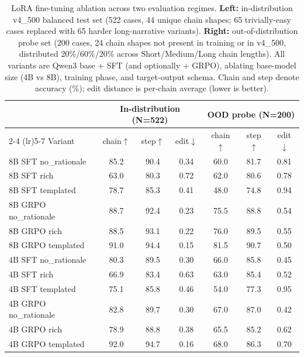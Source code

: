 \begin{table}[!ht]
\centering
\caption{LoRA fine-tuning ablation across two evaluation regimes. \textbf{Left:} in-distribution v4\_500 balanced test set (522 cases, 44 unique chain shapes; 65 trivially-easy cases replaced with 65 harder long-narrative variants). \textbf{Right:} out-of-distribution probe set (200 cases, 24 chain shapes not present in training or in v4\_500, distributed 20\%/60\%/20\% across Short/Medium/Long chain lengths). All variants are Qwen3 base + SFT (and optionally + GRPO), ablating base-model size (4B vs 8B), training phase, and target-output schema. Chain and step denote accuracy (\%); edit distance is per-chain average (lower is better).}
\label{tab:director_routing_lora_full}
\small
\setlength{\tabcolsep}{6pt}
\begin{tabular}{l|ccc|ccc}
\toprule
 & \multicolumn{3}{c|}{In-distribution (N=522)} & \multicolumn{3}{c}{OOD probe (N=200)} \\
\cmidrule(lr){2-4} \cmidrule(lr){5-7}
Variant & chain$\uparrow$ & step$\uparrow$ & edit$\downarrow$ & chain$\uparrow$ & step$\uparrow$ & edit$\downarrow$ \\
\midrule
8B SFT no\_rationale & 85.2 & 90.4 & 0.34 & 60.0 & 81.7 & 0.81 \\
8B SFT rich & 63.0 & 80.3 & 0.72 & 62.0 & 80.6 & 0.78 \\
8B SFT templated & 78.7 & 85.3 & 0.41 & 48.0 & 74.8 & 0.94 \\
8B GRPO no\_rationale & 88.7 & 92.4 & 0.23 & 75.5 & 88.8 & 0.54 \\
8B GRPO rich & 88.5 & 93.1 & 0.22 & 76.0 & 89.5 & 0.55 \\
8B GRPO templated & 91.0 & 94.4 & 0.15 & 81.5 & 90.7 & 0.50 \\
\midrule
4B SFT no\_rationale & 80.3 & 89.5 & 0.30 & 66.0 & 85.8 & 0.45 \\
4B SFT rich & 66.9 & 83.4 & 0.63 & 63.0 & 85.4 & 0.52 \\
4B SFT templated & 75.1 & 85.8 & 0.46 & 54.0 & 77.3 & 0.95 \\
4B GRPO no\_rationale & 82.8 & 89.7 & 0.30 & 67.0 & 87.0 & 0.42 \\
4B GRPO rich & 78.9 & 88.8 & 0.38 & 65.5 & 85.2 & 0.62 \\
4B GRPO templated & 92.0 & 94.7 & 0.16 & 68.0 & 86.3 & 0.70 \\
\bottomrule
\end{tabular}
\end{table}
